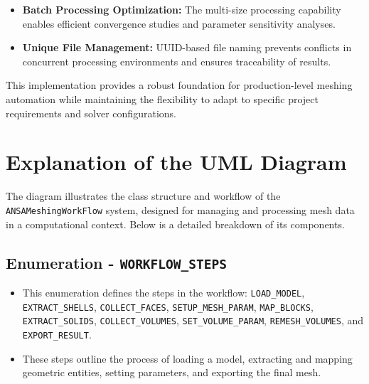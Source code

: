\documentclass{book}
\begin{document}
\begin{itemize}[leftmargin=*,label=\textbullet]
\begin{itemize}
\begin{itemize}[leftmargin=*,label=\textbullet]
    \item \textbf{Batch Processing Optimization:} The multi-size processing capability enables efficient convergence studies and parameter sensitivity analyses.
    
    \item \textbf{Unique File Management:} UUID-based file naming prevents conflicts in concurrent processing environments and ensures traceability of results.
\end{itemize}

This implementation provides a robust foundation for production-level meshing automation while maintaining the flexibility to adapt to specific project requirements and solver configurations.

\section{Explanation of the UML Diagram}
The diagram illustrates the class structure and workflow of the \texttt{ANSAMeshingWorkFlow} system, designed for managing and processing mesh data in a computational context. Below is a detailed breakdown of its components.

\subsection{Enumeration - \texttt{WORKFLOW\_STEPS}}
\begin{itemize}
    \item This enumeration defines the steps in the workflow: \texttt{LOAD\_MODEL}, \texttt{EXTRACT\_SHELLS}, \texttt{COLLECT\_FACES}, \texttt{SETUP\_MESH\_PARAM}, \texttt{MAP\_BLOCKS}, \texttt{EXTRACT\_SOLIDS}, \texttt{COLLECT\_VOLUMES}, \texttt{SET\_VOLUME\_PARAM}, \texttt{REMESH\_VOLUMES}, and \texttt{EXPORT\_RESULT}.
    \item These steps outline the process of loading a model, extracting and mapping geometric entities, setting parameters, and exporting the final mesh.
\end{itemize}


\end{itemize}
\end{itemize}
\end{document}

